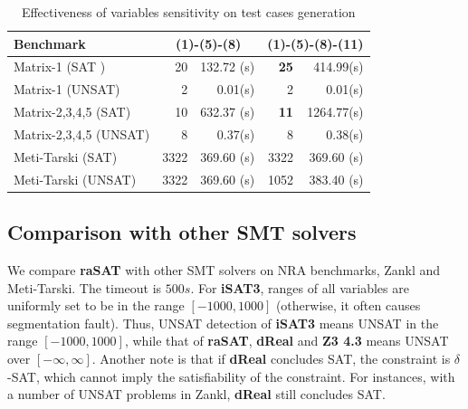 \documentclass[runningheads,a4paper,oribibl]{llncs}
\begin{document}
\begin{table}
\begin{center}
\begin{tabular}{ | l | r | r | r | r |}
\hline
    \multicolumn{1}{|l|}{Benchmark} & \multicolumn{2}{c|}{(1)-(5)-(8)} &
    \multicolumn{2}{c|}{(1)-(5)-(8)-(11)} \\
\hline
    Matrix-1 (SAT ) & 20 & 132.72 (s) & \textbf{25} & 414.99(s)
\\
\hline
    Matrix-1 (UNSAT) & 2 & 0.01(s) & 2 & 0.01(s)
\\
\hline
	Matrix-2,3,4,5 (SAT) & 10 & 632.37 (s) & \textbf{11} & 1264.77(s)
\\
\hline
    Matrix-2,3,4,5 (UNSAT) & 8 & 0.37(s) & 8 & 0.38(s)
\\ \hline
    Meti-Tarski (SAT) & 3322 & 369.60 (s) & 3322 & 369.60 (s)
\\
\hline
    Meti-Tarski (UNSAT) & 3322 & 369.60 (s) & 1052 & 383.40 (s)
\\
\hline
\end{tabular}
\end{center}
\caption{Effectiveness of variables sensitivity on test cases generation} 
\label{tab:test-sen}
\end{table}

\subsection{Comparison with other SMT solvers}

We compare {\bf raSAT} with other SMT solvers on NRA benchmarks, Zankl and Meti-Tarski. 
The timeout is $500s$. 
For {\bf iSAT3}, ranges of all variables are uniformly set to be in the range $[-1000, 1000]$
(otherwise, it often causes segmentation fault). 
Thus, UNSAT detection of {\bf iSAT3} means UNSAT in the range $[-1000, 1000]$, 
while that of {\bf raSAT}, \textbf{dReal} and {\bf Z3 4.3} means  UNSAT over $[-\infty, \infty]$. Another note is that if \textbf{dReal} concludes SAT, the constraint is $\delta$-SAT, which cannot imply the satisfiability of the constraint. For instances, with a number of UNSAT problems in Zankl, \textbf{dReal} still concludes SAT.
\end{document}
